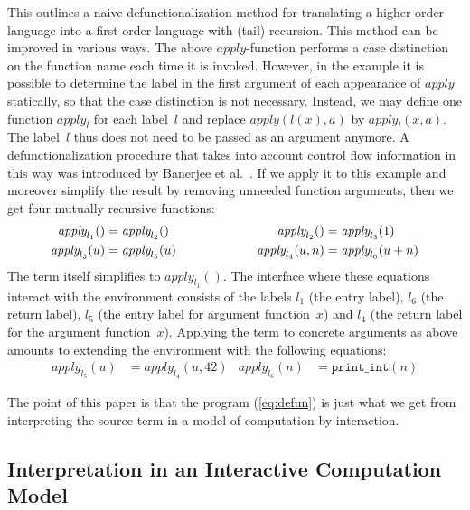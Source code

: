 \documentclass{LMCS}
\theoremstyle{definition}
\theoremstyle{plain}
\newcommand{\Capply}{\textit{apply}}
\begin{document}
This outlines a naive defunctionalization method for translating a
higher-order language into a first-order language with (tail) recursion. 
This method can be improved in various ways. The above
$\Capply$-function performs a case distinction on the function name
each time it is invoked.  However, in the example
it is possible to determine the label in the first argument of each
appearance of $\Capply$ statically, so that the 
case distinction is not necessary.
Instead, we may define one function $\Capply_l$ for each label~$l$
and replace $\Capply(l(x),a)$ by $\Capply_l(x,a)$.
The label~$l$ thus does not need to be passed as an argument anymore. A 
defunctionalization procedure that takes into account control flow
information in this way was introduced by Banerjee et
al.~\cite{banerjee}.
If we apply it to this example and moreover simplify the result by removing
unneeded function arguments, then we get four mutually recursive functions:
\begin{equation}
\begin{aligned}
  \label{eq:defun}
  \Capply_{l_1}() &= \Capply_{l_2}() &
  \Capply_{l_2}() &= \Capply_{l_3}(1) \\ 
  \Capply_{l_3}(u) &= \Capply_{l_5}(u) &
  \hspace{1.9cm}\Capply_{l_4}(u, n) &= \Capply_{l_6}(u+n) \\
\end{aligned}
\end{equation}
The term itself simplifies to $\Capply_{l_1}()$.
The interface where these equations interact with the environment 
consists of the labels $l_1$ (the entry label), $l_6$ (the return label), 
$l_5$ (the entry label for argument function~$x$) and $l_4$ (the return label for
the argument function~$x$). 
Applying the term to concrete arguments as above 
amounts to extending the environment with the following equations:
\begin{align*}
  \Capply_{l_5}(u) &= \Capply_{l_4}(u,42) 
  & \Capply_{l_6}(n) &= \texttt{print\_int}(n)
\end{align*}

The point of this paper is that the program (\ref{eq:defun}) is just  
what we get from interpreting the source term in a model of computation by
interaction.

\subsection{Interpretation in an Interactive Computation Model}
\label{sect:particle}
\end{document}
